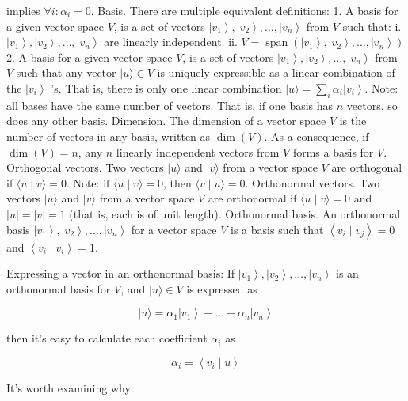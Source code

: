 \documentclass[main.tex]{subfiles}
\begin{document}
    implies $\forall i: \alpha_{i}=0$. Basis. There are multiple equivalent definitions: 1. A basis for a given vector space $V$, is a set of vectors $\left|v_{1}\right\rangle,\left|v_{2}\right\rangle, \ldots,\left|v_{n}\right\rangle$ from $V$ such that: i. $\left|v_{1}\right\rangle,\left|v_{2}\right\rangle, \ldots,\left|v_{n}\right\rangle$ are linearly independent. ii. $V=\operatorname{span}\left(\left|v_{1}\right\rangle,\left|v_{2}\right\rangle, \ldots,\left|v_{n}\right\rangle\right)$ 2. A basis for a given vector space $V$, is a set of vectors $\left|v_{1}\right\rangle,\left|v_{2}\right\rangle, \ldots,\left|v_{n}\right\rangle$ from $V$ such that any vector $|u\rangle \in V$ is uniquely expressible as a linear combination of the $\left|v_{i}\right\rangle$ 's. That is, there is only one linear combination $|u\rangle=\sum_{i} \alpha_{i}\left|v_{i}\right\rangle$. Note: all bases have the same number of vectors. That is, if one basis has $n$ vectors, so does any other basis. Dimension. The dimension of a vector space $V$ is the number of vectors in any basis, written as $\operatorname{dim}(V)$. As a consequence, if $\operatorname{dim}(V)=n$, any $n$ linearly independent vectors from $V$ forms a basis for $V$. Orthogonal vectors. Two vectors $|u\rangle$ and $|v\rangle$ from a vector space $V$ are orthogonal if $\langle u \mid v\rangle=0$. Note: if $\langle u \mid v\rangle=0$, then $\langle v \mid u\rangle=0$. Orthonormal vectors. Two vectors $|u\rangle$ and $|v\rangle$ from a vector space $V$ are orthonormal if $\langle u \mid v\rangle=0$ and $|u|=|v|=1$ (that is, each is of unit length). Orthonormal basis. An orthonormal basis $\left|v_{1}\right\rangle,\left|v_{2}\right\rangle, \ldots,\left|v_{n}\right\rangle$ for a vector space $V$ is a basis such that $\left\langle v_{i} \mid v_{j}\right\rangle=0$ and $\left\langle v_{i} \mid v_{i}\right\rangle=1$.
    
    Expressing a vector in an orthonormal basis: If $\left|v_{1}\right\rangle,\left|v_{2}\right\rangle, \ldots,\left|v_{n}\right\rangle$ is an orthonormal basis for $V$, and $|u\rangle \in V$ is expressed as
    
    $$
    |u\rangle=\alpha_{1}\left|v_{1}\right\rangle+\ldots+\alpha_{n}\left|v_{n}\right\rangle
    $$
    
    then it's easy to calculate each coefficient $\alpha_{i}$ as
    
    $$
    \alpha_{i}=\left\langle v_{i} \mid u\right\rangle
    $$
    
    It's worth examining why: 
    
\end{document}
